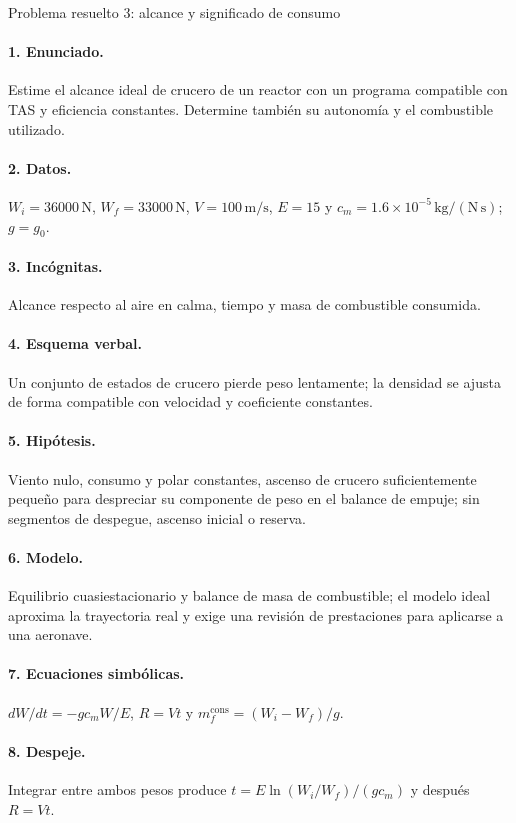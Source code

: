 \begin{studiumworked}{Problema resuelto 3: alcance y significado de consumo}

\paragraph{1. Enunciado.} Estime el alcance ideal de crucero de un reactor con un programa compatible con TAS y eficiencia constantes. Determine también su autonomía y el combustible utilizado.
\paragraph{2. Datos.} $W_i=36000\,\mathrm N$, $W_f=33000\,\mathrm N$, $V=100\,\mathrm{m/s}$, $E=15$ y $c_m=1.6\times10^{-5}\,\mathrm{kg/(N\,s)}$; $g=g_0$.
\paragraph{3. Incógnitas.} Alcance respecto al aire en calma, tiempo y masa de combustible consumida.
\paragraph{4. Esquema verbal.} Un conjunto de estados de crucero pierde peso lentamente; la densidad se ajusta de forma compatible con velocidad y coeficiente constantes.
\paragraph{5. Hipótesis.} Viento nulo, consumo y polar constantes, ascenso de crucero suficientemente pequeño para despreciar su componente de peso en el balance de empuje; sin segmentos de despegue, ascenso inicial o reserva.
\paragraph{6. Modelo.} Equilibrio cuasiestacionario y balance de masa de combustible; el modelo ideal aproxima la trayectoria real y exige una revisión de prestaciones para aplicarse a una aeronave.
\paragraph{7. Ecuaciones simbólicas.} $dW/dt=-gc_m W/E$, $R=Vt$ y $m_f^{\mathrm{cons}}=(W_i-W_f)/g$.
\paragraph{8. Despeje.} Integrar entre ambos pesos produce $t=E\ln(W_i/W_f)/(gc_m)$ y después $R=Vt$.

\end{studiumworked}
